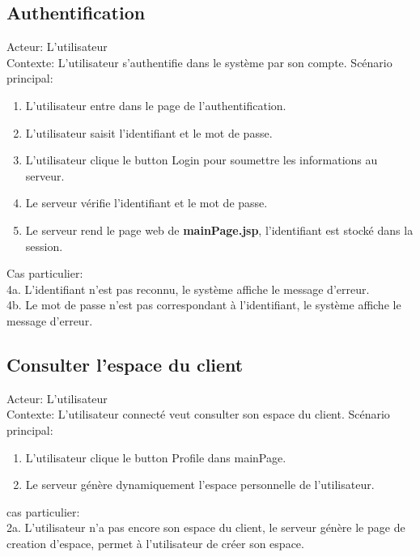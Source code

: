 \documentclass[14px]{article}
\begin{document}
\subsection{Authentification}
Acteur: L'utilisateur\\
Contexte: L'utilisateur s'authentifie dans le système par son compte.
Scénario principal:
\begin{enumerate}
	\item L'utilisateur entre dans le page de l'authentification.
	\item L'utilisateur saisit l'identifiant et le mot de passe.
	\item L'utilisateur clique le button Login pour soumettre les informations au serveur.
	\item Le serveur vérifie l'identifiant et le mot de passe.
	\item Le serveur rend le page web de \textbf{mainPage.jsp}, l'identifiant est stocké dans la session.
\end{enumerate}
Cas particulier: \\
4a. L'identifiant n'est pas reconnu, le système affiche le message d'erreur.\\
4b. Le mot de passe n'est pas correspondant à l'identifiant, le système affiche le message d'erreur.

\subsection{Consulter l'espace du client}
Acteur: L'utilisateur\\
Contexte: L'utilisateur connecté veut consulter son espace du client.
Scénario principal:
\begin{enumerate}
	\item L'utilisateur clique le button Profile dans mainPage.
	\item Le serveur génère dynamiquement l'espace personnelle de l'utilisateur.   
\end{enumerate}
cas particulier:\\
2a. L'utilisateur n'a pas encore son espace du client, le serveur génère le page de creation d'espace, permet à l'utilisateur de créer son espace.
\end{document}

